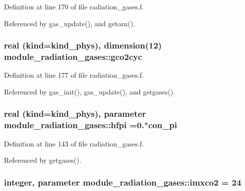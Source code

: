 Definition at line 170 of file radiation\+\_\+gases.\+f.



Referenced by gas\+\_\+update(), and getozn().

\subsubsection[{\texorpdfstring{gco2cyc}{gco2cyc}}]{\setlength{\rightskip}{0pt plus 5cm}real (kind=kind\+\_\+phys), dimension(12) module\+\_\+radiation\+\_\+gases\+::gco2cyc\hspace{0.3cm}{\ttfamily [private]}}\hypertarget{namespacemodule__radiation__gases_ac2a03ad96c9aa598f9751fd689cb615f}{}\label{namespacemodule__radiation__gases_ac2a03ad96c9aa598f9751fd689cb615f}


Definition at line 177 of file radiation\+\_\+gases.\+f.



Referenced by gas\+\_\+init(), gas\+\_\+update(), and getgases().

\subsubsection[{\texorpdfstring{hfpi}{hfpi}}]{\setlength{\rightskip}{0pt plus 5cm}real (kind=kind\+\_\+phys), parameter module\+\_\+radiation\+\_\+gases\+::hfpi =0.$\ast$con\+\_\+pi\hspace{0.3cm}{\ttfamily [private]}}\hypertarget{namespacemodule__radiation__gases_ab99c75954c59ed92a52de94ca6113f73}{}\label{namespacemodule__radiation__gases_ab99c75954c59ed92a52de94ca6113f73}


Definition at line 143 of file radiation\+\_\+gases.\+f.



Referenced by getgases().

\subsubsection[{\texorpdfstring{imxco2}{imxco2}}]{\setlength{\rightskip}{0pt plus 5cm}integer, parameter module\+\_\+radiation\+\_\+gases\+::imxco2 = 24\hspace{0.3cm}{\ttfamily [private]}}\hypertarget{namespacemodule__radiation__gases_a46eb4079ff9932819b3ab133bf6a43d9}{}\label{namespacemodule__radiation__gases_a46eb4079ff9932819b3ab133bf6a43d9}


